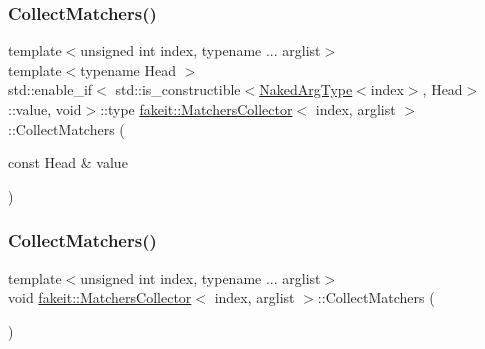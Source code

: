 \mbox{\label{classfakeit_1_1MatchersCollector_affd243a89f758239d77c70dce6318087}} 
\subsubsection{\texorpdfstring{CollectMatchers()}{CollectMatchers()}\hspace{0.1cm}{\footnotesize\ttfamily [9/63]}}
{\footnotesize\ttfamily template$<$unsigned int index, typename ... arglist$>$ \\
template$<$typename Head $>$ \\
std\+::enable\+\_\+if$<$ std\+::is\+\_\+constructible$<$\mbox{\hyperlink{classfakeit_1_1MatchersCollector_aeda8ced6a2f0cb7c6e4f916f18a91730}{Naked\+Arg\+Type}}$<$index$>$, Head$>$\+::value, void$>$\+::type \mbox{\hyperlink{classfakeit_1_1MatchersCollector}{fakeit\+::\+Matchers\+Collector}}$<$ index, arglist $>$\+::Collect\+Matchers (\begin{DoxyParamCaption}\item[{const Head \&}]{value }\end{DoxyParamCaption})\hspace{0.3cm}{\ttfamily [inline]}}

\mbox{\label{classfakeit_1_1MatchersCollector_a2d9a08a347c3915daa33f307a274f13c}} 
\subsubsection{\texorpdfstring{CollectMatchers()}{CollectMatchers()}\hspace{0.1cm}{\footnotesize\ttfamily [10/63]}}
{\footnotesize\ttfamily template$<$unsigned int index, typename ... arglist$>$ \\
void \mbox{\hyperlink{classfakeit_1_1MatchersCollector}{fakeit\+::\+Matchers\+Collector}}$<$ index, arglist $>$\+::Collect\+Matchers (\begin{DoxyParamCaption}{ }\end{DoxyParamCaption})\hspace{0.3cm}{\ttfamily [inline]}}

